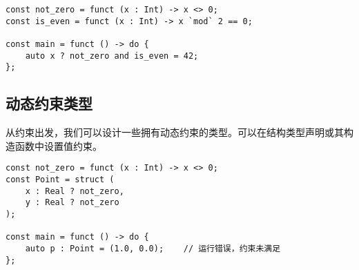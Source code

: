 \begin{lstlisting}
const not_zero = funct (x : Int) -> x <> 0;
const is_even = funct (x : Int) -> x `mod` 2 == 0;

const main = funct () -> do {
    auto x ? not_zero and is_even = 42;
};
\end{lstlisting}


\subsection{动态约束类型}

从约束出发，我们可以设计一些拥有动态约束的类型。可以在结构类型声明或其构造函数中设置值约束。

\begin{minipage}[c]{0.95\textwidth}
\vspace{1.0em}
\begin{lstlisting}
const not_zero = funct (x : Int) -> x <> 0;
const Point = struct (
    x : Real ? not_zero,
    y : Real ? not_zero
);

const main = funct () -> do {
    auto p : Point = (1.0, 0.0);	// 运行错误，约束未满足
};
\end{lstlisting}
\end{minipage}

